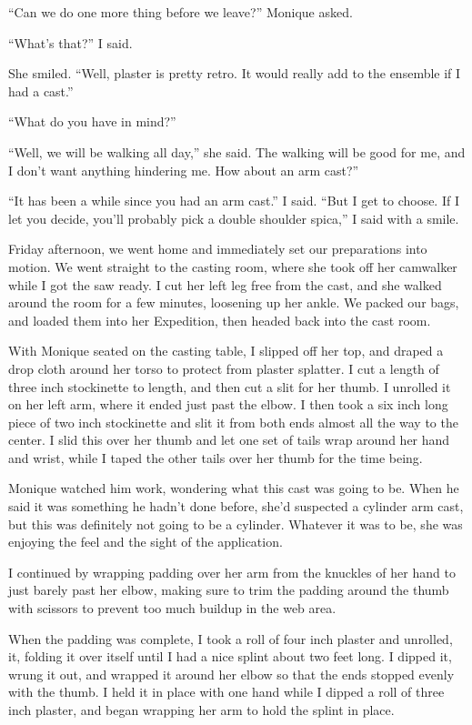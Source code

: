``Can we do one more thing before we leave?'' Monique asked.

``What's that?'' I said.

She smiled. ``Well, plaster is pretty retro. It would really add to the ensemble if I had a
cast.''

``What do you have in mind?''

``Well, we will be walking all day,'' she said. The walking will be good for me, and I don't
want anything hindering me. How about an arm cast?''

``It has been a while since you had an arm cast.'' I said. ``But I get to choose. If I let you
decide, you'll probably pick a double shoulder spica,'' I said with a smile.

Friday afternoon, we went home and immediately set our preparations into motion. We went
straight to the casting room, where she took off her camwalker while I got the saw ready. I cut
her left leg free from the cast, and she walked around the room for a few minutes, loosening up
her ankle. We packed our bags, and loaded them into her Expedition, then headed back into the
cast room.

With Monique seated on the casting table, I slipped off her top, and draped a drop cloth
around her torso to protect from plaster splatter. I cut a length of three inch stockinette to
length, and then cut a slit for her thumb. I unrolled it on her left arm, where it ended just
past the elbow. I then took a six inch long piece of two inch stockinette and slit it from both
ends almost all the way to the center. I slid this over her thumb and let one set of tails wrap
around her hand and wrist, while I taped the other tails over her thumb for the time being.

\begin{thought}
Monique watched him work, wondering what this cast was going to be. When he said it was
something he hadn't done before, she'd suspected a cylinder arm cast, but this was definitely
not going to be a cylinder. Whatever it was to be, she was enjoying the feel and the sight of
the application.
\end{thought}

I continued by wrapping padding over her arm from the knuckles of her hand to just barely past
her elbow, making sure to trim the padding around the thumb with scissors to prevent too much
buildup in the web area.

When the padding was complete, I took a roll of four inch plaster and unrolled, it, folding it
over itself until I had a nice splint about two feet long. I dipped it, wrung it out, and
wrapped it around her elbow so that the ends stopped evenly with the thumb. I held it in place
with one hand while I dipped a roll of three inch plaster, and began wrapping her arm to hold
the splint in place.

